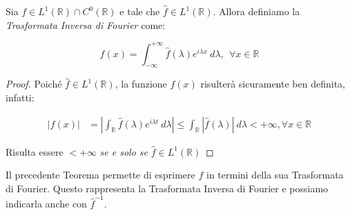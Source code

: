 \begin{theorem}
    Sia $f \in L^1(\mathbb{R}) \cap C^0(\mathbb{R})$ e tale che $\hat{f} \in
        L^1(\mathbb{R})$. Allora definiamo la \textit{Trasformata Inversa di
        Fourier} come:

    $$
        f(x) = \int_{-\infty}^{+\infty} \hat{f}(\lambda) e^{i \lambda x} \
        d\lambda, \ \ \forall x \in \mathbb{R}
    $$
\end{theorem}

\begin{proof}
    Poiché $\hat{f} \in L^1(\mathbb{R})$, la funzione $f(x)$ risulterà
    sicuramente ben definita, infatti:

    \begin{equation}
        \begin{aligned}
            |f(x)| & = \left|\int_{\mathbb{R}} \hat{f}(\lambda) e^{i \lambda t} \ d\lambda \right| \leq \int_{\mathbb{R}} |\hat{f}(\lambda)| \ d\lambda < + \infty, \forall x \in \mathbb{R}
        \end{aligned}
    \end{equation}

    Risulta essere $< +\infty$ \textit{se e solo se} $\hat{f}\in L^1(\mathbb{R})$

\end{proof}

Il precedente Teorema permette di esprimere $f$ in termini della sua Trasformata
di Fourier. Questo rappresenta la Trasformata Inversa di Fourier e possiamo
indicarla anche con $\hat{f}^{-1}$.

